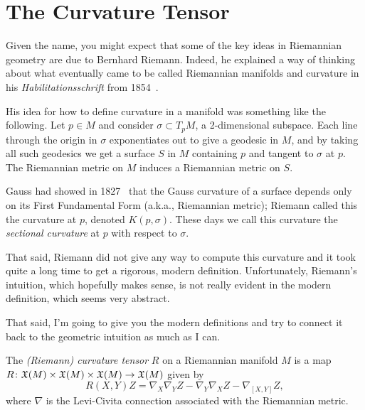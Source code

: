 
\section{The Curvature Tensor}
\label{sec:curvature tensor}

Given the name, you might expect that some of the key ideas in Riemannian geometry are due to Bernhard Riemann. Indeed, he explained a way of thinking about what eventually came to be called Riemannian manifolds and curvature in his \emph{Habilitationsschrift} from 1854~\cite{riemannHypothesesWhichLie2016}.

His idea for how to define curvature in a manifold was something like the following. Let $p \in M$ and consider $\sigma \subset T_pM$, a 2-dimensional subspace. Each line through the origin in $\sigma$ exponentiates out to give a geodesic in $M$, and by taking all such geodesics we get a surface $S$ in $M$ containing $p$ and tangent to $\sigma$ at $p$. The Riemannian metric on $M$ induces a Riemannian metric on $S$.

Gauss had showed in 1827~\cite{gaussGeneralInvestigationsCurved2005} that the Gauss curvature of a surface depends only on its First Fundamental Form (a.k.a., Riemannian metric); Riemann called this the curvature at $p$, denoted $K(p,\sigma)$. These days we call this curvature the \emph{sectional curvature} at $p$ with respect to $\sigma$.

That said, Riemann did not give any way to compute this curvature and it took quite a long time to get a rigorous, modern definition. Unfortunately, Riemann's intuition, which hopefully makes sense, is not really evident in the modern definition, which seems very abstract. 

That said, I'm going to give you the modern definitions and try to connect it back to the geometric intuition as much as I can.

\begin{definition}\label{def:curvature tensor}
	The \emph{(Riemann) curvature tensor} $R$ on a Riemannian manifold $M$ is a map $R \colon\thinspace\! \mathfrak{X}(M) \times \mathfrak{X}(M) \times \mathfrak{X}(M) \to \mathfrak{X}(M)$ given by
	\begin{equation}\label{eq:curvature tensor}
		R(X,Y)Z = \nabla_X \nabla_Y Z - \nabla_Y \nabla_X Z - \nabla_{[X,Y]}Z,
	\end{equation}
	where $\nabla$ is the Levi-Civita connection associated with the Riemannian metric.
\end{definition}

